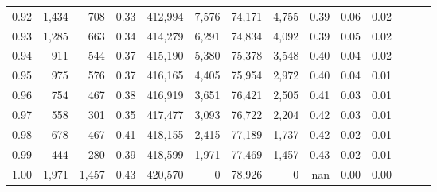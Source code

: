 \begin{tabular}{rrrrrrrrrrrrrr}
0.92 &  1,434 &    708 &  0.33 &  412,994 &    7,576 &  74,171 &   4,755 &  0.39 &  0.06 &      0.02 \\
0.93 &  1,285 &    663 &  0.34 &  414,279 &    6,291 &  74,834 &   4,092 &  0.39 &  0.05 &      0.02 \\
0.94 &    911 &    544 &  0.37 &  415,190 &    5,380 &  75,378 &   3,548 &  0.40 &  0.04 &      0.02 \\
0.95 &    975 &    576 &  0.37 &  416,165 &    4,405 &  75,954 &   2,972 &  0.40 &  0.04 &      0.01 \\
0.96 &    754 &    467 &  0.38 &  416,919 &    3,651 &  76,421 &   2,505 &  0.41 &  0.03 &      0.01 \\
0.97 &    558 &    301 &  0.35 &  417,477 &    3,093 &  76,722 &   2,204 &  0.42 &  0.03 &      0.01 \\
0.98 &    678 &    467 &  0.41 &  418,155 &    2,415 &  77,189 &   1,737 &  0.42 &  0.02 &      0.01 \\
0.99 &    444 &    280 &  0.39 &  418,599 &    1,971 &  77,469 &   1,457 &  0.43 &  0.02 &      0.01 \\
1.00 &  1,971 &  1,457 &  0.43 &  420,570 &        0 &  78,926 &       0 &   nan &  0.00 &      0.00 \\
\bottomrule
\end{tabular}
